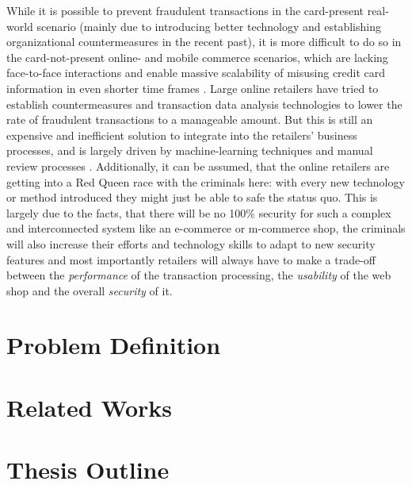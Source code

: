 While it is possible to prevent fraudulent transactions in the card-present real-world scenario (mainly due to introducing better technology and establishing organizational
countermeasures in the recent past), it is more difficult to do so in the card-not-present online- and mobile commerce scenarios, which are lacking face-to-face interactions
and enable massive scalability of misusing credit card information in even shorter time frames \citep{Lewis2015}. Large online retailers have tried to establish countermeasures
and transaction data analysis technologies to lower the rate of fraudulent transactions to a manageable amount. But this is still an expensive and inefficient solution to integrate
into the retailers’ business processes, and is largely driven by machine-learning techniques and manual review processes \citep{Brachmann2015}. Additionally, it can be assumed,
that the online retailers are getting into a Red Queen race with the criminals here: with every new technology or method introduced they might just be able to safe the status quo.
This is largely due to the facts, that there will be no 100\% security for such a complex and interconnected system like an e-commerce or m-commerce shop, the criminals will also
increase their efforts and technology skills to adapt to new security features and most importantly retailers will always have to make a trade-off between the \textit{performance}
of the transaction processing, the \textit{usability} of the web shop and the overall \textit{security} of it.


\section{Problem Definition}
\label{sec:problem_definition}


\section{Related Works}
\label{sec:related_works}


\section{Thesis Outline}
\label{sec:thesis_outline}


